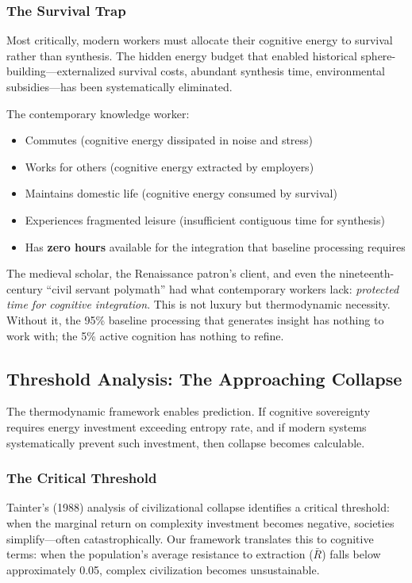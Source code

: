 \subsubsection{The Survival Trap}

Most critically, modern workers must allocate their cognitive energy to survival rather than synthesis. The hidden energy budget that enabled historical sphere-building---externalized survival costs, abundant synthesis time, environmental subsidies---has been systematically eliminated.

The contemporary knowledge worker:
\begin{itemize}
    \item Commutes (cognitive energy dissipated in noise and stress)
    \item Works for others (cognitive energy extracted by employers)
    \item Maintains domestic life (cognitive energy consumed by survival)
    \item Experiences fragmented leisure (insufficient contiguous time for synthesis)
    \item Has \textbf{zero hours} available for the integration that baseline processing requires
\end{itemize}

The medieval scholar, the Renaissance patron's client, and even the nineteenth-century ``civil servant polymath'' had what contemporary workers lack: \textit{protected time for cognitive integration}. This is not luxury but thermodynamic necessity. Without it, the 95\% baseline processing that generates insight has nothing to work with; the 5\% active cognition has nothing to refine.

\subsection{Threshold Analysis: The Approaching Collapse}

The thermodynamic framework enables prediction. If cognitive sovereignty requires energy investment exceeding entropy rate, and if modern systems systematically prevent such investment, then collapse becomes calculable.

\subsubsection{The Critical Threshold}

Tainter's (1988) analysis of civilizational collapse identifies a critical threshold: when the marginal return on complexity investment becomes negative, societies simplify---often catastrophically. Our framework translates this to cognitive terms: when the population's average resistance to extraction ($\bar{R}$) falls below approximately 0.05, complex civilization becomes unsustainable.

